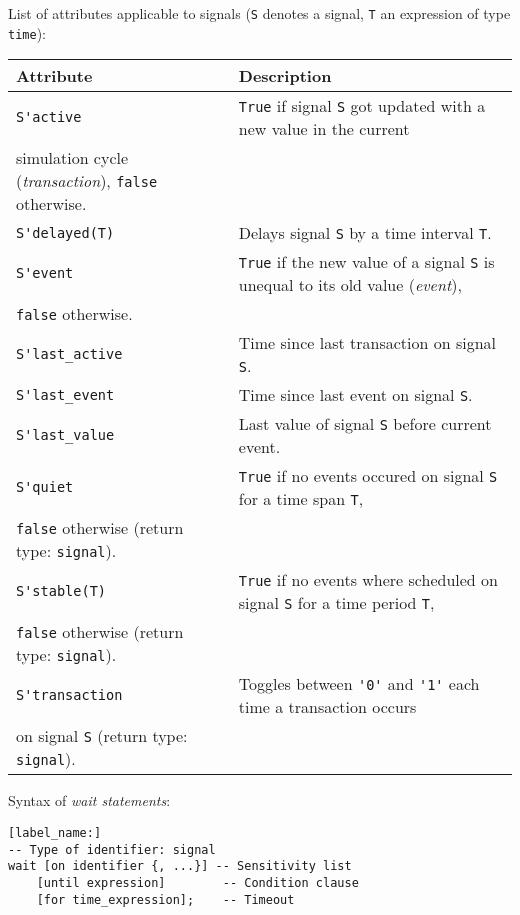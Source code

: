 \documentclass[fontsize=11pt,a4paper]{scrartcl}
\begin{document}
List of attributes applicable to signals (\lstinline!S! denotes a signal, \lstinline!T! an expression of type \lstinline!time!):

\begin{tabular}{ll}
\toprule
	\textbf{Attribute} & \textbf{Description}\\
\midrule
	\lstinline!S'active! & \lstinline!True! if signal \lstinline!S! got updated with a new value in the current\\ simulation cycle (\emph{transaction}), \lstinline!false! otherwise.\\
	\lstinline!S'delayed(T)! & Delays signal \lstinline!S! by a time interval \lstinline!T!.\\
	\lstinline!S'event!& \lstinline!True! if the new value of a signal \lstinline!S! is unequal to its old value (\emph{event}),\\ \lstinline!false! otherwise.\\
	\lstinline!S'last_active! & Time since last transaction on signal \lstinline!S!.\\
	\lstinline!S'last_event! & Time since last event on signal \lstinline!S!.\\
	\lstinline!S'last_value! & Last value of signal \lstinline!S! before current event.\\
	\lstinline!S'quiet! & \lstinline!True! if no events occured on signal \lstinline!S! for a time span \lstinline!T!,\\ \lstinline!false! otherwise (return type: \lstinline!signal!).\\
	\lstinline!S'stable(T)! & \lstinline!True! if no events where scheduled on signal \lstinline!S! for a time period \lstinline!T!,\\ \lstinline!false! otherwise (return type: \lstinline!signal!).\\
	\lstinline!S'transaction! & Toggles between \lstinline!'0'! and \lstinline!'1'! each time a transaction occurs\\ on signal \lstinline!S! (return type: \lstinline!signal!).\\
\bottomrule
\end{tabular}

Syntax of \emph{wait statements}:
\begin{lstlisting}
[label_name:]
-- Type of identifier: signal
wait [on identifier {, ...}] -- Sensitivity list
	[until expression]        -- Condition clause
	[for time_expression];    -- Timeout
\end{lstlisting}
\end{document}
